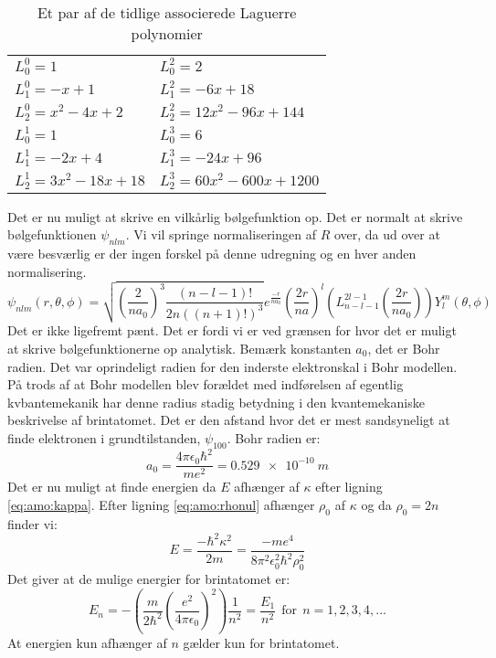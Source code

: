\documentclass[../../Atom-ogMolekylefysik.tex]{subfiles}
\begin{document}
\begin{table}[h]
    \centering
    \begin{tabular}{ll}
        $L_0^0 = 1$ & $L_0^2 = 2$\\
        $L_1^0 = -x+1$ & $L_1^2 = -6x+18$\\
        $L_2^0 = x^2-4x+2$ & $L_2^2 = 12x^2-96x+144$\\
        $L_0^1 = 1$ & $L_0^3 = 6$\\
        $L_1^1 = -2x+4$ & $L_1^3 = -24x+96$\\
        $L_2^1 = 3x^2-18x+18$ & $L_2^3 = 60x^2-600x+1200$\\
    \end{tabular}
    \caption{Et par af de tidlige associerede Laguerre polynomier}
    \label{tab:amo:laguerre}
\end{table}
Det er nu muligt at skrive en vilkårlig bølgefunktion op. Det er normalt at skrive bølgefunktionen $\psi_{nlm}$. Vi vil springe normaliseringen af $R$ over, da ud over at være besværlig er der ingen forskel på denne udregning og en hver anden normalisering.
\begin{equation}
    \psi_{nlm}(r,\theta,\phi) = \sqrt{\left(\frac{2}{na_0}\right)^3\frac{(n-l-1)!}{2n((n+1)!)^3}}e^{\frac{-r}{na_0}}\left(\frac{2r}{na}\right)^l\left(L_{n-l-1}^{2l-1}\left(\frac{2r}{na_0}\right)\right)Y_l^m(\theta,\phi)
\end{equation}
Det er ikke ligefremt pænt. Det er fordi vi er ved grænsen for hvor det er muligt at skrive bølgefunktionerne op analytisk. 
Bemærk konstanten $a_0$, det er Bohr radien. Det var oprindeligt radien for den inderste elektronskal i Bohr modellen. På trods af at Bohr modellen blev forældet med indførelsen af egentlig kvbantemekanik har denne radius stadig betydning i den kvantemekaniske beskrivelse af brintatomet. Det er den afstand hvor det er mest sandsyneligt at finde elektronen i grundtilstanden, $\psi_{100}$. Bohr radien er:
\begin{equation}
    a_0 = \frac{4\pi\epsilon_0\hbar^2}{me^2} = \SI{0.529e-10}{m}
\end{equation}
Det er nu muligt at finde energien da $E$ afhænger af $\kappa$ efter ligning \eqref{eq:amo:kappa}. Efter ligning \eqref{eq:amo:rhonul} afhænger $\rho_0$ af $\kappa$ og da $\rho_0=2n$ finder vi:
\begin{equation}
    E = \frac{-\hbar^2\kappa^2}{2m} = \frac{-me^4}{8\pi^2\epsilon_0^2\hbar^2\rho_0^2}
\end{equation}
Det giver at de mulige energier for brintatomet er:
\begin{equation}
    E_n = -\left(\frac{m}{2\hbar^2}\left(\frac{e^2}{4\pi\epsilon_0}\right)^2\right)\frac{1}{n^2}= \frac{E_1}{n^2}~~\text{for}~~n=1,2,3,4,...
\end{equation}
At energien kun afhænger af $n$ gælder kun for brintatomet.
\end{document}

